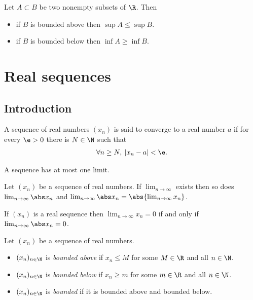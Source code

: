 \documentclass{article}
\begin{document}
\begin{lemma}
	Let $A\subset B$ be two nonempty subsets of $\R$. Then
	\begin{itemize}
		\item if $B$ is bounded above then $\sup A\leq\sup B$.
		\item if $B$ is bounded below then $\inf A\geq\inf B$.
	\end{itemize}
\end{lemma}


\section{Real sequences}


\subsection{Introduction}

\begin{definition}
	A sequence of real numbers $(x_n)$ is said to converge to a real number $a$
	if for every $\e>0$ there is $N\in\N$ such that
	\begin{align*}
		\forall n\geq N,\: |x_n-a|<\e.
	\end{align*}
\end{definition}

\setcounter{theorem}{5}
\begin{lemma}
	A sequence has at most one limit.
\end{lemma}

\begin{lemma}
	Let $(x_n)$ be a sequence of real numbers. If $\lim_{n\to\infty}$ exists then so does
	$\lim_{n\to\infty}\abs x_n$ and $\lim_{n\to\infty}\abs x_n=\abs{\lim_{n\to\infty}x_n}$.
\end{lemma}

\begin{lemma}
	If $(x_n)$ is a real sequence then $\lim_{n\to\infty}x_n=0$ if and only if $\lim_{n\to\infty}\abs x_n = 0$.
\end{lemma}

\begin{definition}
	Let $(x_n)$ be a sequence of real numbers.
	\begin{itemize}
		\item $(x_n)_{n\in\N}$ is \emph{bounded above} if $x_n\leq M$ for some $M\in\R$ and all $n\in\N$.
		\item $(x_n)_{n\in\N}$ is \emph{bounded below} if $x_n\geq m$ for some $m\in\R$ and all $n\in\N$.
		\item $(x_n)_{n\in\N}$ is \emph{bounded} if it is bounded above and bounded below.
	\end{itemize}
\end{definition}
\end{document}
